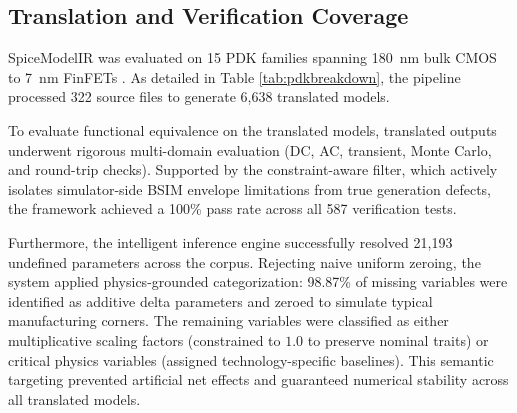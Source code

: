 \documentclass[conference]{IEEEtran}
\begin{document}
\subsection{Translation and Verification Coverage}

SpiceModelIR was evaluated on 15 PDK families spanning 180~nm bulk CMOS to 7~nm FinFETs \cite{Clark_2016, Edwards_OpenPDK, SkyWater_2023, GlobalFoundries_2023}. As detailed in Table \ref{tab:pdkbreakdown}, the pipeline processed 322 source files to generate 6,638 translated models. 

To evaluate functional equivalence on the translated models, translated outputs underwent rigorous multi-domain evaluation (DC, AC, transient, Monte Carlo, and round-trip checks). Supported by the constraint-aware filter, which actively isolates simulator-side BSIM envelope limitations from true generation defects, the framework achieved a 100\% pass rate across all 587 verification tests. 

Furthermore, the intelligent inference engine successfully resolved 21,193 undefined parameters across the corpus. Rejecting naive uniform zeroing, the system applied physics-grounded categorization: 98.87\% of missing variables were identified as additive delta parameters and zeroed to simulate typical manufacturing corners. The remaining variables were classified as either multiplicative scaling factors (constrained to $1.0$ to preserve nominal traits) or critical physics variables (assigned technology-specific baselines). This semantic targeting prevented artificial net effects and guaranteed numerical stability across all translated models.
\end{document}
